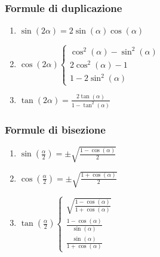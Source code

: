         \subsubsection{Formule di duplicazione}\label{Trigonometria_Duplicazione}
            \begin{enumerate}
                \item {
                    $\sin(2\alpha) =2\sin(\alpha)\cos(\alpha)$ 
                }
                \item {
                    $
                        \cos(2\alpha)
                        \begin{cases}
                            \cos^2(\alpha) - \sin^2(\alpha) \\
                            2\cos^2(\alpha)-1\\
                            1-2\sin^2(\alpha)
                        \end{cases}
                    $
                }
                \item {
                    $\tan(2\alpha) =\frac{2\tan(\alpha)}{1-\tan^2(\alpha)}$ 
                }
            \end{enumerate}
            \subsubsection{Formule di bisezione}\label{Trigonometria_Bisezione}
                \begin{enumerate}
                    \item {
                        $\sin(\frac{\alpha}{2}) =\pm\sqrt{\frac{1-\cos(\alpha)}{2}}$ 
                    }
                    \item {
                        $\cos(\frac{\alpha}{2}) =\pm\sqrt{\frac{1+\cos(\alpha)}{2}}$ 
                    }
                    \item {
                        $
                            \tan(\frac{\alpha}{2})
                            \begin{cases}
                                \sqrt{\frac{1-\cos(\alpha)}{1+\cos(\alpha)}} \\
                                \frac{1-\cos(\alpha)}{\sin(\alpha)}\\
                                \frac{\sin(\alpha)}{1+\cos(\alpha)}
                            \end{cases}
                        $
                    }
                \end{enumerate}
